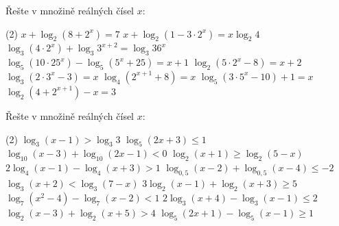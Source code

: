 \begin{exercise}
    Řešte v množině reálných čísel $x$:
    \begin{tasks}(2)
        \task $x + \log_{2}\!\left(8 + 2^{x}\right) = 7$
        \task $x + \log_{2}\!\left(1 - 3\cdot 2^{x}\right) = x \log_{2} 4$
        \task $\log_{3}\!\left(4\cdot 2^{x}\right) + \log_{3} 3^{x+2} = \log_{3} 36^{x}$
        \task $\log_{5}\!\left(10\cdot 25^{x}\right) - \log_{5}\!\left(5^{x} + 25\right) = x + 1$
        \task $\log_{2}\!\left(5\cdot 2^{x} - 8\right) = x + 2$
        \task $\log_{3}\!\left(2\cdot 3^{x} - 3\right) = x$
        \task $\log_{4}\!\left(2^{x+1} + 8\right) = x$
        \task {}
        \task $\log_{5}\!\left(3\cdot 5^{x} - 10\right) + 1 = x$
        \task $\log_{2}\!\left(4 + 2^{x+1}\right) - x = 3$
    \end{tasks}
\end{exercise}


\setcounter{section}{2}
\begin{exercise}
    Řešte v množině reálných čísel $x$:
    \begin{tasks}(2)
        \task $\log_{3}(x-1) > \log_{3} 3$
        \task $\log_{5}(2x+3) \leq 1$
        \task $\log_{10}(x-3) + \log_{10}(2x-1) < 0$
        \task $\log_{2}(x+1) \geq \log_{2}(5 - x)$
        \task $2\log_{4}(x-1) - \log_{4}(x+3) > 1$
        \task $\log_{0{,}5}(x-2) + \log_{0{,}5}(x-4) \leq -2$
        \task $\log_{3}(x+2) < \log_{3}(7 - x)$
        \task $3\log_{2}(x-1) + \log_{2}(x+3) \geq 5$
        \task $\log_{7}(x^{2} - 4) - \log_{7}(x - 2) < 1$
        \task $2\log_{3}(x + 4) - \log_{3}(x - 1) \leq 2$
        \task $\log_{2}(x - 3) + \log_{2}(x + 5) > 4$
        \task $\log_{5}(2x + 1) - \log_{5}(x - 1) \geq 1$
    \end{tasks}
\end{exercise}


